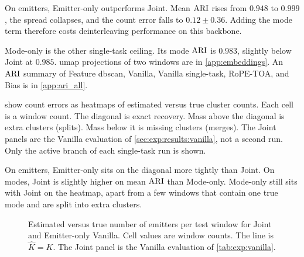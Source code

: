 \begin{table}[tbp]
  \centering
  \caption{Mode clustering for joint versus single-task objectives on the Vanilla encoder. Entries follow the same aggregation as \cref{tab:exp:ablation_em}.}
  \label{tab:exp:ablation_md}
  \small
\end{table}

On emitters, Emitter-only outperforms Joint.
Mean $\mathrm{ARI}$ rises from $0.948$ to $0.999$, the spread collapses, and the count error falls to $0.12\pm0.36$.
Adding the mode term therefore costs deinterleaving performance on this backbone.

Mode-only is the other single-task ceiling.
Its mode $\mathrm{ARI}$ is $0.983$, slightly below Joint at $0.985$.
\Gls{umap} projections of two windows are in \cref{app:embeddings}.
An $\mathrm{ARI}$ summary of Feature \gls{dbscan}, Vanilla, Vanilla single-task, RoPE-TOA, and Bias is in \cref{app:ari_all}.

 show count errors as heatmaps of estimated versus true cluster counts.
Each cell is a window count.
The diagonal is exact recovery.
Mass above the diagonal is extra clusters (splits).
Mass below it is missing clusters (merges).
The Joint panels are the Vanilla evaluation of \cref{sec:exp:results:vanilla}, not a second run.
Only the active branch of each single-task run is shown.

On emitters, Emitter-only sits on the diagonal more tightly than Joint.
On modes, Joint is slightly higher on mean $\mathrm{ARI}$ than Mode-only.
Mode-only still sits with Joint on the heatmap, apart from a few windows that contain one true mode and are split into extra clusters.

\begin{figure}[tbp]
  \centering
  \caption{Estimated versus true number of emitters per test window for Joint and Emitter-only Vanilla. Cell values are window counts. The line is $\hat{K}=K$. The Joint panel is the Vanilla evaluation of \cref{tab:exp:vanilla}.}
  \label{fig:exp:kcorr_ablation_em}
\end{figure}


